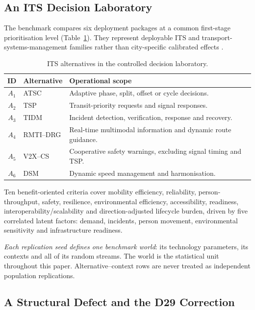 \documentclass[runningheads,orivec]{llncs}
\begin{document}
\subsection{An ITS Decision Laboratory}
\label{sec:lab}

The benchmark compares six deployment packages at a common first-stage prioritisation
level (Table~\ref{tab:alternatives}). They represent deployable ITS and
transport-systems-management families rather than city-specific calibrated effects
\cite{fhwa2016corridors,fhwa2017atm,usdotv2x}.

\begin{table}[t]
\centering
\caption{ITS alternatives in the controlled decision laboratory.}
\label{tab:alternatives}
\small
\begin{tabularx}{\linewidth}{@{}c l X@{}}
\toprule
\textbf{ID} & \textbf{Alternative} & \textbf{Operational scope}\\
\midrule
$A_1$ & ATSC & Adaptive phase, split, offset or cycle decisions.\\
$A_2$ & TSP & Transit-priority requests and signal responses.\\
$A_3$ & TIDM & Incident detection, verification, response and recovery.\\
$A_4$ & RMTI--DRG & Real-time multimodal information and dynamic route guidance.\\
$A_5$ & V2X--CS & Cooperative safety warnings, excluding signal timing and TSP.\\
$A_6$ & DSM & Dynamic speed management and harmonisation.\\
\bottomrule
\end{tabularx}
\end{table}

Ten benefit-oriented criteria cover mobility efficiency, reliability,
person-throughput, safety, resilience, environmental efficiency, accessibility,
readiness, interoperability/scalability and direction-adjusted lifecycle burden, driven
by five correlated latent factors: demand, incidents, person movement, environmental
sensitivity and infrastructure readiness.

\emph{Each replication seed defines one benchmark world}: its technology parameters,
its contexts and all of its random streams. The world is the statistical unit
throughout this paper. Alternative--context rows are never treated as independent
population replications.

\subsection{A Structural Defect and the D29 Correction}
\label{sec:generator}
\end{document}
